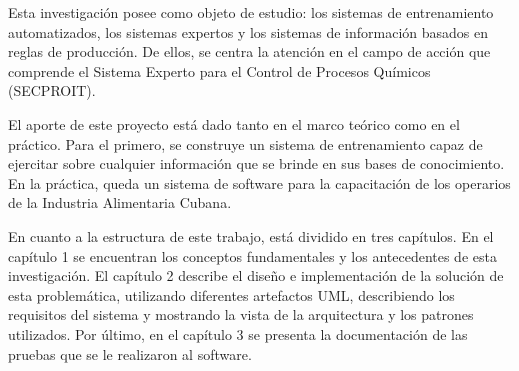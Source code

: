 Esta investigación posee como objeto de estudio: los sistemas de entrenamiento automatizados, los sistemas expertos y los sistemas de información basados en reglas de producción. De ellos, se centra la atención en el campo de acción que comprende el Sistema Experto para el Control de Procesos Químicos (SECPROIT).

El aporte de este proyecto está dado tanto en el marco teórico como en el práctico. Para el primero, se construye un sistema de entrenamiento capaz de ejercitar sobre cualquier información que se brinde en sus bases de conocimiento. En la práctica, queda un sistema de software para la capacitación de los operarios de la Industria Alimentaria Cubana.

En cuanto a la estructura de este trabajo, está dividido en tres capítulos. En el capítulo 1 se encuentran los conceptos fundamentales y los antecedentes de esta investigación. El capítulo 2 describe el diseño e implementación de la solución de esta problemática, utilizando diferentes artefactos UML, describiendo los requisitos del sistema y mostrando la vista de la arquitectura y los patrones utilizados. Por último, en el capítulo 3 se presenta la documentación de las pruebas que se le realizaron al software.